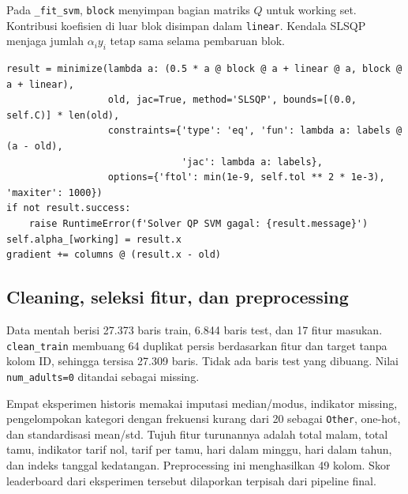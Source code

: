 Pada \texttt{\_fit\_svm}, \texttt{block} menyimpan bagian matriks $Q$ untuk working set. Kontribusi koefisien di luar blok disimpan dalam \texttt{linear}. Kendala SLSQP menjaga jumlah $\alpha_i y_i$ tetap sama selama pembaruan blok.
\begin{lstlisting}[caption={Subproblem SLSQP dan pembaruan koefisien dual},label={lst:svm_solver}]
result = minimize(lambda a: (0.5 * a @ block @ a + linear @ a, block @ a + linear),
                  old, jac=True, method='SLSQP', bounds=[(0.0, self.C)] * len(old),
                  constraints={'type': 'eq', 'fun': lambda a: labels @ (a - old),
                               'jac': lambda a: labels},
                  options={'ftol': min(1e-9, self.tol ** 2 * 1e-3), 'maxiter': 1000})
if not result.success:
    raise RuntimeError(f'Solver QP SVM gagal: {result.message}')
self.alpha_[working] = result.x
gradient += columns @ (result.x - old)
\end{lstlisting}


\subsection{Cleaning, seleksi fitur, dan preprocessing}
Data mentah berisi 27.373 baris train, 6.844 baris test, dan 17 fitur masukan. \texttt{clean\_train} membuang 64 duplikat persis berdasarkan fitur dan target tanpa kolom ID, sehingga tersisa 27.309 baris. Tidak ada baris test yang dibuang. Nilai \texttt{num\_adults=0} ditandai sebagai missing.

Empat eksperimen historis memakai imputasi median/modus, indikator missing, pengelompokan kategori dengan frekuensi kurang dari 20 sebagai \texttt{Other}, one-hot, dan standardisasi mean/std. Tujuh fitur turunannya adalah total malam, total tamu, indikator tarif nol, tarif per tamu, hari dalam minggu, hari dalam tahun, dan indeks tanggal kedatangan. Preprocessing ini menghasilkan 49 kolom. Skor leaderboard dari eksperimen tersebut dilaporkan terpisah dari pipeline final.

